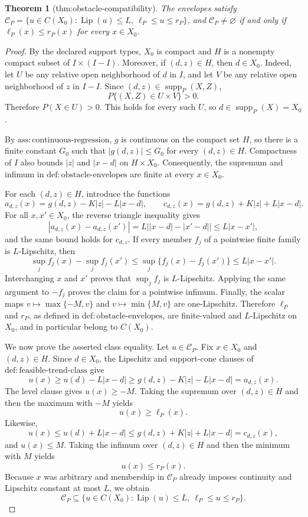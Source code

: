 \documentclass{article}
\newtheorem{theorem}{Theorem}
\begin{document}
\begin{theorem}[thm:obstacle-compatibility]\label{thm:obstacle-compatibility}
The envelopes satisfy \(\mathcal C_P=\{u\in C(X_0):\operatorname{Lip}(u)\le L,\ \ell_P\le u\le r_P\}\), and \(\mathcal C_P\neq\varnothing\) if and only if \(\ell_P(x)\le r_P(x)\) for every \(x\in X_0\).
\end{theorem}
\begin{proof}
By the declared support types, \(X_0\) is compact and \(H\) is a nonempty compact subset of \(I\times(I-I)\).  Moreover, if \((d,z)\in H\), then \(d\in X_0\).  Indeed, let \(U\) be any relative open neighborhood of \(d\) in \(I\), and let \(V\) be any relative open neighborhood of \(z\) in \(I-I\).  Since \((d,z)\in\operatorname{supp}_P(X,Z)\),
\[
P\{(X,Z)\in U\times V\}>0.
\]
Therefore \(P(X\in U)>0\).  This holds for every such \(U\), so \(d\in\operatorname{supp}_P(X)=X_0\).

By \(\mathrm{ass:continuous\mbox{-}regression}\), \(g\) is continuous on the compact set \(H\), so there is a finite constant \(G_0\) such that \(|g(d,z)|\le G_0\) for every \((d,z)\in H\).  Compactness of \(I\) also bounds \(|z|\) and \(|x-d|\) on \(H\times X_0\).  Consequently, the supremum and infimum in \(\mathrm{def:obstacle\mbox{-}envelopes}\) are finite at every \(x\in X_0\).

For each \((d,z)\in H\), introduce the functions
\[
a_{d,z}(x)=g(d,z)-K|z|-L|x-d|,
\qquad
c_{d,z}(x)=g(d,z)+K|z|+L|x-d|.
\]
For all \(x,x'\in X_0\), the reverse triangle inequality gives
\[
|a_{d,z}(x)-a_{d,z}(x')|
=L\bigl||x-d|-|x'-d|\bigr|
\le L|x-x'|,
\]
and the same bound holds for \(c_{d,z}\).  If every member \(f_j\) of a pointwise finite family is \(L\)-Lipschitz, then
\[
\sup_j f_j(x)-\sup_j f_j(x')
\le \sup_j\{f_j(x)-f_j(x')\}
\le L|x-x'|.
\]
Interchanging \(x\) and \(x'\) proves that \(\sup_j f_j\) is \(L\)-Lipschitz.  Applying the same argument to \(-f_j\) proves the claim for a pointwise infimum.  Finally, the scalar maps \(v\mapsto\max\{-M,v\}\) and \(v\mapsto\min\{M,v\}\) are one-Lipschitz.  Therefore \(\ell_P\) and \(r_P\), as defined in \(\mathrm{def:obstacle\mbox{-}envelopes}\), are finite-valued and \(L\)-Lipschitz on \(X_0\), and in particular belong to \(C(X_0)\).

We now prove the asserted class equality.  Let \(u\in\mathcal C_P\).  Fix \(x\in X_0\) and \((d,z)\in H\).  Since \(d\in X_0\), the Lipschitz and support-cone clauses of \(\mathrm{def:feasible\mbox{-}trend\mbox{-}class}\) give
\[
u(x)
\ge u(d)-L|x-d|
\ge g(d,z)-K|z|-L|x-d|
=a_{d,z}(x).
\]
The level clause gives \(u(x)\ge -M\).  Taking the supremum over \((d,z)\in H\) and then the maximum with \(-M\) yields
\[
u(x)\ge \ell_P(x).
\]
Likewise,
\[
u(x)
\le u(d)+L|x-d|
\le g(d,z)+K|z|+L|x-d|
=c_{d,z}(x),
\]
and \(u(x)\le M\).  Taking the infimum over \((d,z)\in H\) and then the minimum with \(M\) yields
\[
u(x)\le r_P(x).
\]
Because \(x\) was arbitrary and membership in \(\mathcal C_P\) already imposes continuity and Lipschitz constant at most \(L\), we obtain
\[
\mathcal C_P
\subseteq
\{u\in C(X_0):\operatorname{Lip}(u)\le L,\ \ell_P\le u\le r_P\}.
\]


\end{proof}
\end{document}

